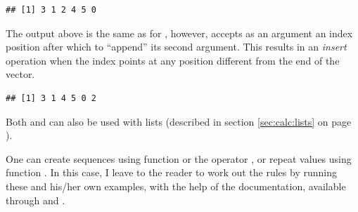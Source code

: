 \documentclass[krantz2]{krantz}\usepackage{knitr}
\begin{document}
\begin{knitrout}\footnotesize
{}\color{fgcolor}\begin{kframe}
\begin{alltt}
\end{alltt}
\begin{verbatim}
## [1] 3 1 2 4 5 0
\end{verbatim}
\end{kframe}
\end{knitrout}

The output above is the same as for , however,  accepts as an argument an index position after which to ``append'' its second argument. This results in an \emph{insert} operation when the index points at any position different from the end of the vector.

\begin{knitrout}\footnotesize
{}\color{fgcolor}\begin{kframe}
\begin{alltt}
    \hlstd{=} \hlstd{)}
\end{alltt}
\begin{verbatim}
## [1] 3 1 4 5 0 2
\end{verbatim}
\end{kframe}
\end{knitrout}

Both  and  can also be used with lists (described in section \ref{sec:calc:lists} on page \pageref{sec:calc:lists}).

\begin{playground}\label{pg:seq:rep}
One can create sequences using function  or the operator \Roperator{:}, or repeat values using function . In this case, I leave to the reader to work out the rules by running these and his/her own examples, with the help of the documentation, available through  and .

\begin{knitrout}\footnotesize
{}\color{fgcolor}\begin{kframe}
\begin{alltt}
 \hlkwb{<-} \hlopt{-}\hlopt{:}
 \hlkwb{<-} \hlopt{:-}
 \hlkwb{<-} \hlstd{(} \hlstd{=} \hlopt{-}\hlstd{,}  \hlstd{=} \hlstd{,}  \hlstd{=} \hlstd{)}
 \hlkwb{<-} \hlstd{(}\hlopt{-}\hlstd{,} \hlstd{)}
\end{alltt}
\end{kframe}
\end{knitrout}

\end{playground}
\end{document}
